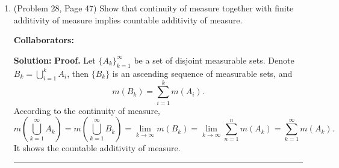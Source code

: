 \documentclass{article}%
\newenvironment{proof}[1][Proof]{\textbf{#1.} }{\ \rule{0.5em}{0.5em}}
\begin{document}
\begin{enumerate}
\item (Problem 28, Page 47) Show that continuity of measure together  with finite additivity of measure implies countable additivity of measure.

\bigskip
\textbf{Collaborators:}\\
\smallskip
 
\textbf{Solution:}
\begin{proof}
Let $\{A_k\}_{k=1}^\infty$ be a set of disjoint measurable sets. Denote $B_k = \bigcup_{i=1}^k A_i$, then $\{B_k\}$ is an ascending sequence of measurable sets, and 
$$
m(B_k) = \sum_{i=1}^k m(A_i).
$$
According to the continuity of measure, 
$$
m\left(\bigcup_{k=1}^{\infty}A_k \right) = m\left(\bigcup_{k=1}^\infty B_k\right) = \lim_{k\to\infty}m(B_k) = \lim_{k\to\infty}\sum_{n=1}^n m(A_k) = \sum_{k=1}^{\infty}m(A_k).
$$
It shows the countable additivity of measure.
\end{proof}
\bigskip


\end{enumerate}
\end{document}
